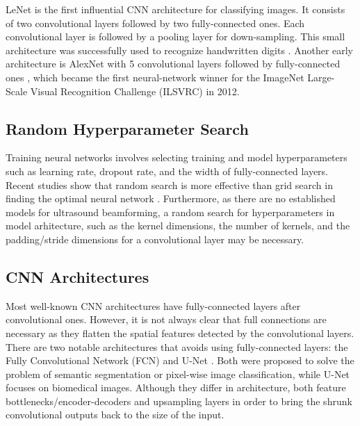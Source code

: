      LeNet is the first influential CNN architecture for classifying images. It consists of two convolutional layers followed by two fully-connected ones. Each convolutional layer is followed by a pooling layer for down-sampling. This small architecture was successfully used to recognize handwritten digits \cite{lenet}. Another early architecture is AlexNet with 5 convolutional layers followed by fully-connected ones \cite{krizhevsky2012imagenet}, which became the first neural-network winner for the ImageNet Large-Scale Visual Recognition Challenge (ILSVRC) in 2012.

    \subsection{Random Hyperparameter Search}
      Training neural networks involves selecting training and model hyperparameters such as learning rate, dropout rate, and the width of fully-connected layers. Recent studies show that random search is more effective than grid search in finding the optimal neural network \cite{bergstra2012random}. Furthermore, as there are no established models for ultrasound beamforming, a random search for hyperparameters in model arhitecture, such as the kernel dimensions, the number of kernels, and the padding/stride dimensions for a convolutional layer may be necessary.

    \subsection{CNN Architectures}
      Most well-known CNN architectures have fully-connected layers after convolutional ones. However, it is not always clear that full connections are necessary as they flatten the spatial features detected by the convolutional layers. There are two notable architectures that avoids using fully-connected layers: the Fully Convolutional Network (FCN) \cite{long2015fcn} and U-Net \cite{ronneberger2015unet}. Both were proposed to solve the problem of semantic segmentation or pixel-wise image classification, while U-Net focuses on biomedical images. Although they differ in architecture, both feature bottlenecks/encoder-decoders and upsampling layers in order to bring the shrunk convolutional outputs back to the size of the input.

